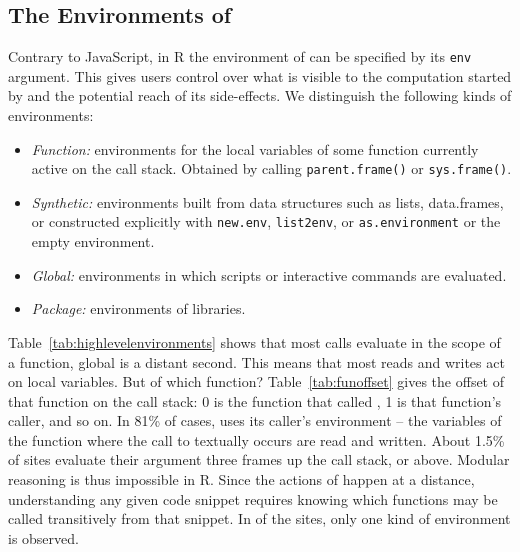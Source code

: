 \documentclass[acmsmall, screen]{acmart}
\renewcommand{\k}[1]{\lstinline |#1|\xspace}
\begin{document}
\subsection{The Environments of \Eval}\label{sec:env}

Contrary to JavaScript, in R the environment of \eval can be specified by its
\k{env} argument. This gives users control over what is visible to the
computation started by \eval and the potential reach of its side-effects. We
distinguish the following kinds of environments:

\begin{itemize}[---]
\item \emph{Function:} environments for the local variables of some function
  currently active on the call stack. Obtained by calling \k{parent.frame()} or
  \k{sys.frame()}.
\item \emph{Synthetic:} environments built from data structures such as lists,
  data.frames, or constructed explicitly with \k{new.env}, \k{list2env}, or
  \k{as.environment} or the empty environment.
\item \emph{Global:} environments in which scripts or interactive commands are
  evaluated.
\item \emph{Package:} environments of libraries.
\end{itemize}


Table~\ref{tab:highlevelenvironments} shows that most calls evaluate in the
scope of a function, global is a distant second. This means that most reads and
writes act on local variables. But of which function? Table~\ref{tab:funoffset}
gives the offset of that function on the call stack: 0 is the function that called
\eval, 1 is that function's caller, and so on. In 81\% of cases, \eval uses
its caller's environment -- the variables of the function where the call to \eval
textually occurs are read and written. About 1.5\% of sites evaluate their
argument three frames up the call stack, or above. Modular reasoning is thus
impossible in R. Since the actions of \eval happen at a distance, understanding
any given code snippet requires knowing which functions may be called
transitively from that snippet. In \packageNbOneCategoryEnvirSitePercent of
the sites, only one kind of environment is observed.
\end{document}
